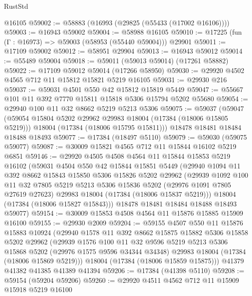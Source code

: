 \begin{lexlean}{RustStd}
\begin{coremodule}
    @16105
@59002 := @58883 (@16993 (@29825 (@55433 (@17002 @16106))))
@59003 := @16943 @59002
@59004 := @58988 @16105
@59010 := @17225 (fun (Γ : @16973) => @59003 (@58953 (@55440 @59004))) @29901
@59011 := @17109 @59002
@59012 := @58951 @29904
@59013 := @16943 @59012
@59014 := @55489 @59004
@59018 := @59011 (@59013 @59014) (@17261 @58882)
@59022 := @17109 @59012 @59014 (@17266 @58950)
@59030 := @29920 @4502 @4565 @712 @11 @15812 @15821 @5219 @16105
@59031 := @29930 @216
@59037 := @59031 @4501 @550 @42 @15812 @15819 @5449
@59047 := @55667 @101 @11 @392 @7770 @15811 @15818 @5306 @15794 @5202 @55680
@59054 := @29940 @100 @11 @32 @8662 @5219 @5213 @5306
@59075 := @59037
    (@59047
      (@59054 @15804 @5202 @29962 @29983 @18004 (@17384 (@18006 @15805 @5219)))
      @18004
      (@17384 (@18006 @15795 @15811)))
    @18478
    @18481
    @18484
    @18488
    @18493
@59077 := @17384 (@18497 @5110)
@59079 := @59030 (@59075 @59077)
@59087 := @30009 @15821 @4565 @712 @11 @15844 @16102 @5219 @6851
@59146 := @29920
    @4505
    @4508
    @4564
    @11
    @15844
    @15853
    @5219
    @16102
    (@59031
      @4504
      @550
      @42
      @15844
      @15851
      @5449
      (@29940
        @1094
        @11
        @392
        @8662
        @15843
        @15850
        @5306
        @15826
        @5202
        @29962
        (@29939
          @1092
          @100
          @11
          @32
          @7805
          @5219
          @5213
          @5306
          @15836
          @5202
          (@29976 @1091 @7805 @27619 @27623)
          @29983
          @18004
          (@17384 (@18006 @15837 @5219)))
        @18004
        (@17384 (@18006 @15827 @15843)))
      @18478
      @18481
      @18484
      @18488
      @18493
      @59077)
@59154 := @30009 @15853 @4508 @4564 @11 @15876 @15885 @15909 @16100
@59155 := @29930 @2009
@59204 := @59155
    @4507
    @550
    @11
    @15876
    @15883
    @10924
    (@29940
      @1578
      @11
      @392
      @8662
      @15875
      @15882
      @5306
      @15858
      @5202
      @29962
      (@29939
        @1576
        @100
        @11
        @32
        @9596
        @5219
        @5213
        @5306
        @15868
        @5202
        (@29976 @1575 @9596 @34344 @34348)
        @29983
        @18004
        (@17384 (@18006 @15869 @5219)))
      @18004
      (@17384 (@18006 @15859 @15875)))
    @41379
    @41382
    @41385
    @41389
    @41394
@59206 := @17384 (@41398 @5110)
@59208 := @59154 (@59204 @59206)
@59260 := @29920
    @4511
    @4562
    @712
    @11
    @15909
    @15918
    @5219
    @16100

\end{coremodule}
\end{lexlean}
